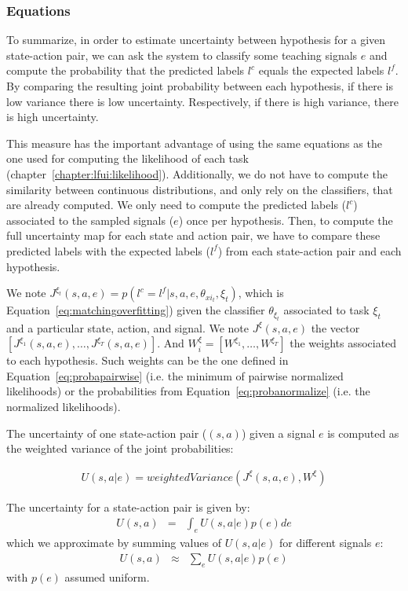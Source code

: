 \newpage

\subsubsection*{Equations}

To summarize, in order to estimate uncertainty between hypothesis for a given state-action pair, we can ask the system to classify some teaching signals $e$ and compute the probability that the predicted labels $l^c$ equals the expected labels $l^f$. By comparing the resulting joint probability between each hypothesis, if there is low variance there is low uncertainty. Respectively, if there is high variance, there is high uncertainty. 

This measure has the important advantage of using the same equations as the one used for computing the likelihood of each task (chapter~\ref{chapter:lfui:likelihood}). Additionally, we do not have to compute the similarity between continuous distributions, and only rely on the classifiers, that are already computed. We only need to compute the predicted labels ($l^c$) associated to the sampled signals ($e$) once per hypothesis. Then, to compute the full uncertainty map for each state and action pair, we have to compare these predicted labels with the expected labels ($l^f$) from each state-action pair and each hypothesis.

We note $J^{\xi_t}(s,a,e) = p(l^c = l^f | s, a, e, \theta_{xi_t}, \xi_t)$, which is Equation~\ref{eq:matchingoverfitting}) given the classifier $\theta_{\xi_t}$ associated to task $\xi_t$ and a particular state, action, and signal. We note $J^{\xi}(s,a,e)$ the vector $[J^{\xi_1}(s,a,e), \ldots, J^{\xi_T}(s,a,e)]$. And $W_{i}^{\xi} = [W^{\xi_1}, \ldots, W^{\xi_T}]$ the weights associated to each hypothesis. Such weights can be the one defined in Equation~\ref{eq:probapairwise} (i.e. the minimum of pairwise normalized likelihoods) or the probabilities from Equation~\ref{eq:probanormalize} (i.e. the normalized likelihoods).

The uncertainty of one state-action pair ($(s,a)$) given a signal $e$ is computed as the weighted variance of the joint probabilities:

\begin{eqnarray}
U(s,a|e) = weightedVariance(J^{\xi}(s,a,e), W^{\xi})
\label{eq:planningOneSignal}
\end{eqnarray}

The uncertainty for a state-action pair is given by:
\begin{eqnarray}
U(s,a) & = & \int_{e} U(s,a|e) p(e) de
\end{eqnarray}
which we approximate by summing values of $U(s,a|e)$ for different signals $e$:
\begin{eqnarray}
U(s,a) & \approx & \sum_{e} U(s,a|e) p(e)
\label{eq:planning}
\end{eqnarray}
with $p(e)$ assumed uniform.

